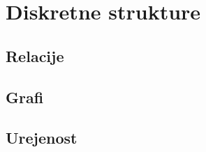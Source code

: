 \chapter{Diskretne strukture}
\label{chap:strukture}


\section{Relacije}
\label{sec:relacije}

\section{Grafi}
\label{sec:grafi}

\section{Urejenost}
\label{sec:urejenost}




